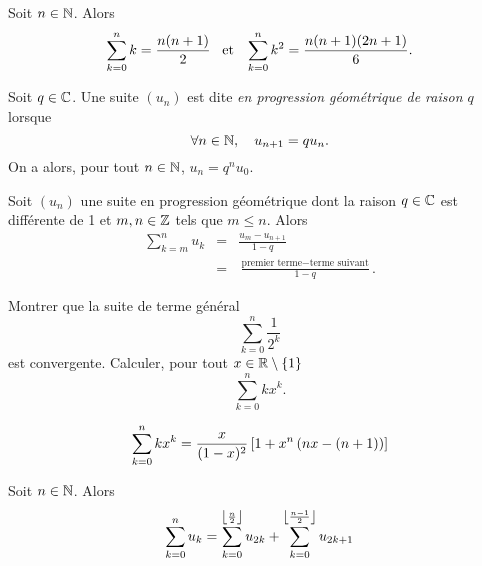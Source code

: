 \documentclass{magnoliaold}
\begin{document}
\begin{proposition}
  Soit $n\in\mathbb{N}$. Alors
  \[\sum_{k=0}^n k=\frac{n(n+1)}{2} \quad\!\text{et}\quad\! \sum_{k=0}^n k^2=\frac{n(n+1)(2n+1)}{6}.\]
  \end{proposition}



\begin{definition}
Soit $q\in\mathbb{C}$. Une suite $(u_n)$ est dite \emph{en progression géométrique de raison $q$} lorsque
\[\forall n \in \mathbb{N},\quad  u_{n+1}= q u_n.\]
On a alors, pour tout $n \in \mathbb{N}$, $u_n = q^n u_0$.
\end{definition}

\begin{proposition}
Soit $(u_n)$ une suite en progression géométrique dont la raison $q\in\mathbb{C}$ est différente de 1 et $m,n\in\mathbb{Z}$ tels que $m\leq n$. Alors
\begin{eqnarray*}
\sum_{k=m}^n u_k
&=& \frac{u_m - u_{n+1}}{1-q}\\
&=& \frac{\text{premier terme}-\text{terme suivant}}{1-q}.
\end{eqnarray*}
\end{proposition}

\begin{exos}
\exo Montrer que la suite de terme général
  \[\sum_{k=0}^n \frac{1}{2^k}\]
  est convergente.
\exo Calculer, pour tout $x\in\mathbb{R}\setminus\left\{1\right\}$
  \[\sum_{k=0}^n k x^k.\]
  \begin{sol}
\[\sum_{k=0}^n k x^k=\frac{x}{(1-x)^2}\left[1+x^n\left(nx-(n+1)\right)\right]\]
  \end{sol}
\end{exos}

\begin{proposition}
Soit $n\in\mathbb{N}$. Alors
  \[\sum_{k=0}^n u_k=\sum_{k=0}^{\left\lfloor\frac{n}{2}\right\rfloor} u_{2k}+
    \sum_{k=0}^{\left\lfloor\frac{n-1}{2}\right\rfloor} u_{2k+1}\]
\end{proposition}

\end{document}
